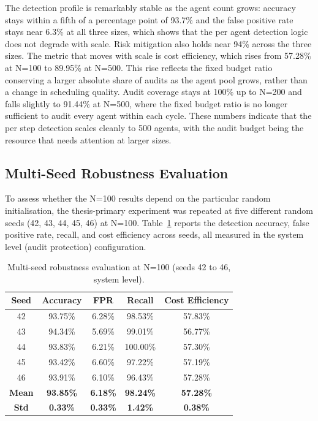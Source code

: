 \noindent
The detection profile is remarkably stable as the agent count grows: accuracy stays within a fifth of a percentage point of 93.7\% and the false positive rate stays near 6.3\% at all three sizes, which shows that the per agent detection logic does not degrade with scale. Risk mitigation also holds near 94\% across the three sizes. The metric that moves with scale is cost efficiency, which rises from 57.28\% at N=100 to 89.95\% at N=500. This rise reflects the fixed budget ratio conserving a larger absolute share of audits as the agent pool grows, rather than a change in scheduling quality. Audit coverage stays at 100\% up to N=200 and falls slightly to 91.44\% at N=500, where the fixed budget ratio is no longer sufficient to audit every agent within each cycle. These numbers indicate that the per step detection scales cleanly to 500 agents, with the audit budget being the resource that needs attention at larger sizes.


\subsection{Multi-Seed Robustness Evaluation}

To assess whether the N=100 results depend on the particular random initialisation, the thesis-primary experiment was repeated at five different random seeds (42, 43, 44, 45, 46) at N=100. Table~\ref{tab:multiseed} reports the detection accuracy, false positive rate, recall, and cost efficiency across seeds, all measured in the system level (audit protection) configuration.

\begin{table}[H]
\centering
\caption{Multi-seed robustness evaluation at N=100 (seeds 42 to 46, system level).}
\label{tab:multiseed}
\begin{tabular}{|c|c|c|c|c|}
\hline
\textbf{Seed} & \textbf{Accuracy} & \textbf{FPR} & \textbf{Recall} & \textbf{Cost Efficiency} \\ \hline
42 & 93.75\% & 6.28\% & 98.53\% & 57.83\% \\ \hline
43 & 94.34\% & 5.69\% & 99.01\% & 56.77\% \\ \hline
44 & 93.83\% & 6.21\% & 100.00\% & 57.30\% \\ \hline
45 & 93.42\% & 6.60\% & 97.22\% & 57.19\% \\ \hline
46 & 93.91\% & 6.10\% & 96.43\% & 57.28\% \\ \hline
\textbf{Mean} & \textbf{93.85\%} & \textbf{6.18\%} & \textbf{98.24\%} & \textbf{57.28\%} \\ \hline
\textbf{Std} & \textbf{0.33\%} & \textbf{0.33\%} & \textbf{1.42\%} & \textbf{0.38\%} \\ \hline
\end{tabular}
\end{table}

